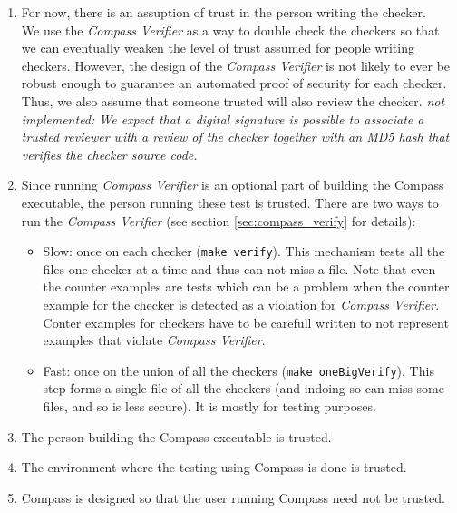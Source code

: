 \begin{enumerate}
   \item For now, there is an assuption of trust in the person writing the checker. \\
      We use the \emph{Compass Verifier} as a way to double check the 
      checkers so that we can eventually weaken the level of trust assumed for people 
      writing checkers. However, the design of the \emph{Compass Verifier} is not likely to
      ever be robust enough to guarantee an automated proof of security for each checker.  
      Thus, we also assume that someone trusted will also review the checker.
      {\em not implemented: We expect that a digital signature is possible to associate 
      a trusted reviewer with a review of the checker together with an MD5 hash that
      verifies the checker source code.}

   \item Since running \emph{Compass Verifier} is an optional part of building 
      the Compass executable, the person running these test is trusted. There are
      two ways to run the \emph{Compass Verifier} (see section \ref{sec:compass_verify}
    for details):
      \begin{itemize}
         \item Slow: once on each checker ({\tt make verify}). This mechanism
            tests all the files one checker at a time and thus can not miss 
            a file.  Note that even the counter examples are tests which can 
            be a problem when the counter example for the checker is detected
            as a violation for \emph{Compass Verifier}.  Conter examples for
            checkers have to be carefull written to not represent examples that
            violate \emph{Compass Verifier}.
         \item Fast: once on the union of all the checkers ({\tt make oneBigVerify}).
            This step forms a single file of all the checkers (and indoing so can
            miss some files, and so is less secure).  It is mostly for testing 
            purposes.
      \end{itemize}

   \item The person building the Compass executable is trusted.

   \item The environment where the testing using Compass is done is trusted.

   \item Compass is designed so that the user running Compass need not be trusted.

\end{enumerate}

